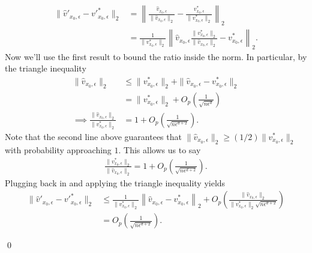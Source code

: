 \documentclass[11pt]{article}
\begin{document}
\begin{align*}
    \|\hat{v}'_{x_0, \epsilon} - v'^*_{x_0, \epsilon}\|_2 &= \left\|\frac{\hat{v}_{x_0, \epsilon}}{\|\hat{v}_{x_0, \epsilon}\|_2} - \frac{v^*_{x_0, \epsilon}}{\|v^*_{x_0, \epsilon}\|_2}\right\|_2 \\
    &= \frac{1}{\|v^*_{x_0, \epsilon}\|_2}\left\|\hat{v}_{x_0, \epsilon}\frac{\|v^*_{x_0, \epsilon}\|_2}{\|\hat{v}_{x_0, \epsilon}\|_2} - v^*_{x_0, \epsilon}\right\|_2.
\end{align*}
Now we'll use the first result to bound the ratio inside the norm. In particular, by the triangle inequality
\begin{align*} 
    \|\hat{v}_{x_0, \epsilon}\|_2  &\leq \|v^*_{x_0, \epsilon}\|_2 + \|\hat{v}_{x_0, \epsilon} - v^*_{x_0, \epsilon}\|_2 \\
    &= \|v^*_{x_0, \epsilon}\|_2 + O_p\left(\frac{1}{\sqrt{n\epsilon^d}}\right) \\
    \implies \frac{\|\hat{v}_{x_0, \epsilon}\|_2}{\|v^*_{x_0, \epsilon}\|_2} &= 1 + O_p\left(\frac{1}{\sqrt{n\epsilon^{d+2}}}\right). 
\end{align*}
Note that the second line above guarantees that $\|\hat{v}_{x_0, \epsilon}\|_2 \geq (1/2)\|v^*_{x_0, \epsilon}\|_2$ with probability approaching $1$. This allows us to say
\begin{align}
    \frac{\|v^*_{x_0, \epsilon}\|_2}{\|\hat{v}_{x_0, \epsilon}\|_2} = 1 + O_p\left(\frac{1}{\sqrt{n\epsilon^{d+2}}}\right). \label{eq: velocity norm ratio}
\end{align}
Plugging back in and applying the triangle inequality yields
\begin{align*}
    \|\hat{v}'_{x_0, \epsilon} - v'^*_{x_0, \epsilon}\|_2     &\leq \frac{1}{\|v^*_{x_0, \epsilon}\|_2}\left\|\hat{v}_{x_0, \epsilon} - v^*_{x_0, \epsilon} \right\|_2 + O_p\left(\frac{\|\hat{v}_{x_0, \epsilon}\|_2}{\|v^*_{x_0, \epsilon}\|_2\sqrt{n\epsilon^{d+2}}}\right) \\
    &= O_p\left(\frac{1}{\sqrt{n\epsilon^{d+2}}}\right) .
\end{align*}

\qed{}
\end{document}
